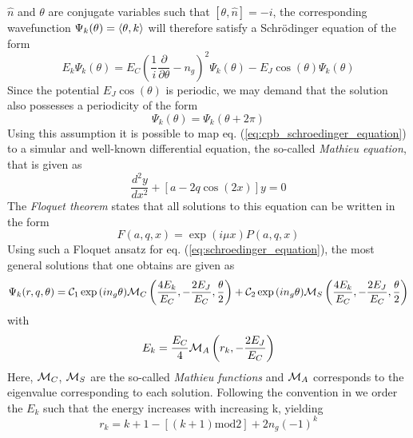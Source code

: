 $\hat{n}$ and $\theta$ are conjugate variables such that $[\theta,\hat{n}]=-i$, the corresponding wavefunction $\Psi_k(\theta) = \left< \theta,k \right>$ will therefore satisfy a Schrödinger equation of the form
%
\begin{equation}
E_k \Psi_k(\theta) = E_C(\frac{1}{i}\frac{\partial}{\partial \theta}-n_g)^2 \Psi_k(\theta) - E_J \cos{\left(\theta\right)}\Psi_k(\theta) \label{eq:cpb_schroedinger_equation}
\end{equation}
%
Since the potential $E_J\cos{(\theta)}$ is periodic, we may demand that the solution also possesses a periodicity of the form
%
\begin{equation}
\Psi_k(\theta) = \Psi_k(\theta+2\pi)
\end{equation}
%
Using this assumption it is possible to map eq. (\ref{eq:cpb_schroedinger_equation}) to a simular and well-known differential equation, the so-called {\it Mathieu  equation}, that is given as
%
\begin{equation}
\frac{d^2y}{dx^2}+\left[a-2q\cos{(2x)}\right]y = 0
\end{equation}
%
The {\it Floquet theorem} states that all solutions to this equation can be written in the form
%
\begin{equation}
F(a,q,x) = \exp{\left(i\mu x\right)}P(a,q,x)
\end{equation}
%
Using such a Floquet ansatz for eq. (\ref{eq:schroedinger_equation}), the most general solutions that one obtains are given as \citep{cottet_implementation_2002}
%
\begin{equation}
\Psi_k(r,q,\theta) = \mcal{C}_1\exp{\left(i n_g \theta \right)}\mcal{M}_C\left(\frac{4E_k}{E_C},-\frac{2E_J}{E_C},\frac{\theta}{2}\right)+\mcal{C}_2\exp{\left(i n_g \theta \right)}\mcal{M}_S \left(\frac{4 E_k}{E_C},-\frac{2 E_J}{E_C},\frac{\theta}{2}\right)
\end{equation}
%
with 
%
\begin{equation}
E_k = \frac{E_C}{4}\mcal{M}_A \left(r_k,-\frac{2 E_J}{E_C} \right)
\end{equation}
%
Here, $\mcal{M}_C$, $\mcal{M}_S$ are the so-called {\it Mathieu functions} and $\mcal{M}_A$ corresponds to the eigenvalue corresponding to each solution. Following the convention in \citep{cottet_implementation_2002} we order the $E_k$ such that the energy increases with increasing k, yielding
%
\begin{equation}
r_k = k+1-\left[(k+1)\mathrm{mod}2\right]+2n_g(-1)^k
\end{equation}
%

